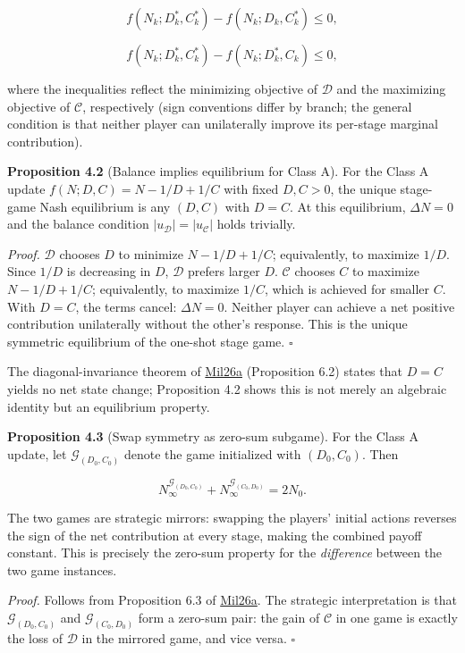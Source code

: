 \documentclass[12pt]{article}
\begin{document}
\[f(N_k; D_k^*, C_k^*) - f(N_k; D_k, C_k^*) \leq 0,\]

\[f(N_k; D_k^*, C_k^*) - f(N_k; D_k^*, C_k) \leq 0,\]

where the inequalities reflect the minimizing objective of
\(\mathcal{D}\) and the maximizing objective of \(\mathcal{C}\),
respectively (sign conventions differ by branch; the general condition
is that neither player can unilaterally improve its per-stage marginal
contribution).

\textbf{Proposition 4.2} (Balance implies equilibrium for Class A). For
the Class A update \(f(N; D, C) = N - 1/D + 1/C\) with fixed
\(D, C > 0\), the unique stage-game Nash equilibrium is any \((D, C)\)
with \(D = C\). At this equilibrium, \(\Delta N = 0\) and the balance
condition \(|u_{\mathcal{D}}| = |u_{\mathcal{C}}|\) holds trivially.

\emph{Proof.} \(\mathcal{D}\) chooses \(D\) to minimize
\(N - 1/D + 1/C\); equivalently, to maximize \(1/D\). Since \(1/D\) is
decreasing in \(D\), \(\mathcal{D}\) prefers larger \(D\).
\(\mathcal{C}\) chooses \(C\) to maximize \(N - 1/D + 1/C\);
equivalently, to maximize \(1/C\), which is achieved for smaller \(C\).
With \(D = C\), the terms cancel: \(\Delta N = 0\). Neither player can
achieve a net positive contribution unilaterally without the other's
response. This is the unique symmetric equilibrium of the one-shot stage
game. \(\square\)

The diagonal-invariance theorem of
\href{https://github.com/baardev/truevalue/blob/main/docnav/Research/papers/1_recursive-tholonic-five-constants/1_recursive-tholonic-five-constants.pdf}{Mil26a}
(Proposition 6.2) states that \(D = C\) yields no net state change;
Proposition 4.2 shows this is not merely an algebraic identity but an
equilibrium property.

\textbf{Proposition 4.3} (Swap symmetry as zero-sum subgame). For the
Class A update, let \(\mathcal{G}_{(D_0, C_0)}\) denote the game
initialized with \((D_0, C_0)\). Then

\[N_\infty^{\mathcal{G}_{(D_0, C_0)}} + N_\infty^{\mathcal{G}_{(C_0, D_0)}} = 2 N_0.\]

The two games are strategic mirrors: swapping the players' initial
actions reverses the sign of the net contribution at every stage, making
the combined payoff constant. This is precisely the zero-sum property
for the \emph{difference} between the two game instances.

\emph{Proof.} Follows from Proposition 6.3 of
\href{https://github.com/baardev/truevalue/blob/main/docnav/Research/papers/1_recursive-tholonic-five-constants/1_recursive-tholonic-five-constants.pdf}{Mil26a}.
The strategic interpretation is that \(\mathcal{G}_{(D_0, C_0)}\) and
\(\mathcal{G}_{(C_0, D_0)}\) form a zero-sum pair: the gain of
\(\mathcal{C}\) in one game is exactly the loss of \(\mathcal{D}\) in
the mirrored game, and vice versa. \(\square\)
\end{document}
